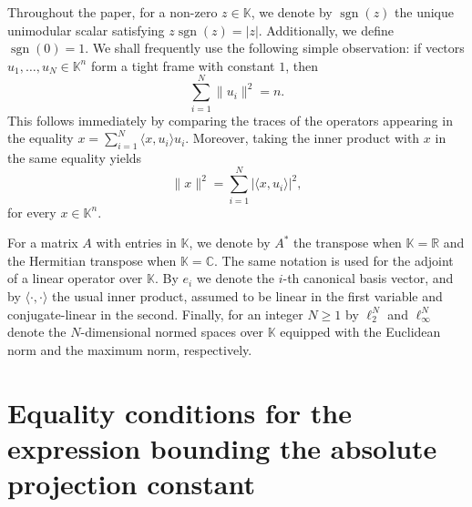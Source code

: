 \documentclass[12pt, reqno]{amsart}
\theoremstyle{definition}
\theoremstyle{remark}
\numberwithin{equation}{section}
\DeclareMathOperator{\sgn}{sgn}
\begin{document}
Throughout the paper, for a non-zero $z \in \mathbb{K}$, we denote by $\sgn(z)$ the unique unimodular scalar satisfying $z\sgn(z) = |z|$. Additionally, we define $\sgn(0)=1$. We shall frequently use the following simple observation: if vectors $u_1,\ldots,u_N \in \mathbb{K}^n$ form a tight frame with constant $1$, then
\begin{equation}
\label{eqtrace}
\sum_{i=1}^{N} \|u_i\|^2 = n.
\end{equation}
This follows immediately by comparing the traces of the operators appearing in the equality $x = \sum_{i=1}^{N} \langle x, u_i \rangle u_i$. Moreover, taking the inner product with $x$ in the same equality yields
\begin{equation}
\label{eqnorma}
\|x\|^2 = \sum_{i=1}^{N} |\langle x, u_i \rangle |^2,
\end{equation}
for every $x \in \mathbb{K}^n$.

For a matrix $A$ with entries in $\mathbb{K}$, we denote by $A^*$ the transpose when $\mathbb{K}=\mathbb{R}$ and the Hermitian transpose when $\mathbb{K}=\mathbb{C}$. The same notation is used for the adjoint of a linear operator over $\mathbb{K}$. By $e_i$ we denote the $i$-th canonical basis vector, and by $\langle \cdot,\cdot\rangle$ the usual inner product, assumed to be linear in the first variable and conjugate-linear in the second. Finally, for an integer $N \geq 1$ by $\ell_2^N$ and $\ell_{\infty}^N$ denote the $N$-dimensional normed spaces over $\mathbb{K}$ equipped with the Euclidean norm and the maximum norm, respectively.




\section{Equality conditions for the expression bounding the absolute projection constant}
\label{seceqcond}
\end{document}
